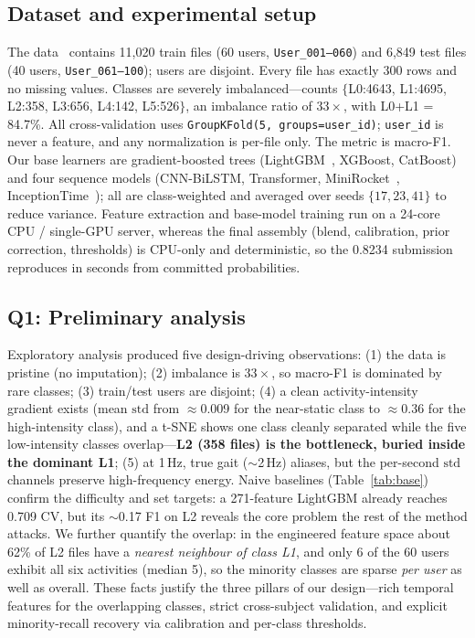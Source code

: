 \documentclass[conference]{IEEEtran}
\begin{document}
\subsection{Dataset and experimental setup}
The data~\cite{bruno2014adl} contains 11{,}020 train files (60 users, \texttt{User\_001--060}) and 6{,}849
test files (40 users, \texttt{User\_061--100}); users are disjoint. Every file has exactly 300 rows and no
missing values. Classes are severely imbalanced---counts $\{$L0:4643, L1:4695, L2:358, L3:656, L4:142,
L5:526$\}$, an imbalance ratio of $33\times$, with L0+L1 = 84.7\%. All cross-validation uses
\texttt{GroupKFold(5, groups=user\_id)}; \texttt{user\_id} is never a feature, and any normalization is
per-file only. The metric is macro-F1. Our base learners are gradient-boosted trees
(LightGBM~\cite{ke2017lightgbm}, XGBoost, CatBoost) and four sequence models (CNN-BiLSTM, Transformer,
MiniRocket~\cite{dempster2021minirocket}, InceptionTime~\cite{ismailfawaz2020inceptiontime}); all are
class-weighted and averaged over seeds $\{17,23,41\}$ to reduce variance. Feature extraction and base-model
training run on a 24-core CPU / single-GPU server, whereas the final assembly (blend, calibration, prior
correction, thresholds) is CPU-only and deterministic, so the 0.8234 submission reproduces in seconds from
committed probabilities.

\subsection{Q1: Preliminary analysis}
Exploratory analysis produced five design-driving observations: (1) the data is pristine (no imputation);
(2) imbalance is $33\times$, so macro-F1 is dominated by rare classes; (3) train/test users are disjoint;
(4) a clean activity-intensity gradient exists (mean $\text{std}$ from $\approx$0.009 for the near-static
class to $\approx$0.36 for the high-intensity class), and a t-SNE shows one class cleanly separated while the
five low-intensity classes overlap---\textbf{L2 (358 files) is the bottleneck, buried inside the dominant
L1}; (5) at 1\,Hz, true gait ($\sim$2\,Hz) aliases, but the per-second $\text{std}$ channels preserve
high-frequency energy. Naive baselines (Table~\ref{tab:base}) confirm the difficulty and set targets: a
271-feature LightGBM already reaches 0.709 CV, but its $\sim$0.17 F1 on L2 reveals the core problem the rest
of the method attacks. We further quantify the overlap: in the engineered feature space about 62\% of L2
files have a \emph{nearest neighbour of class L1}, and only 6 of the 60 users exhibit all six activities
(median 5), so the minority classes are sparse \emph{per user} as well as overall. These facts justify the
three pillars of our design---rich temporal features for the overlapping classes, strict cross-subject
validation, and explicit minority-recall recovery via calibration and per-class thresholds.
\end{document}
